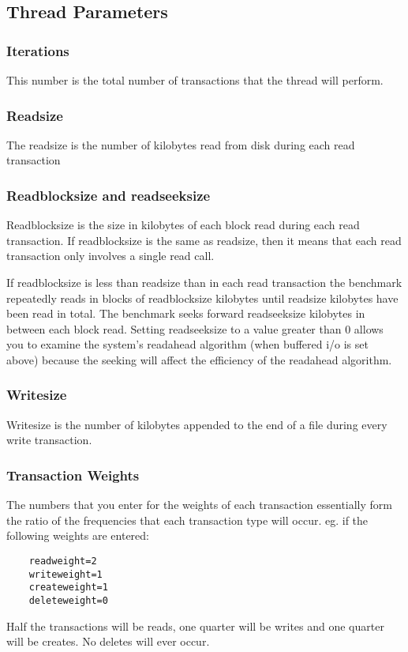 \documentclass[twocolumn]{article}
\begin{document}
\subsection{Thread Parameters}

\subsubsection{Iterations}

This number is the total number of transactions that the thread will
perform.

\subsubsection{Readsize}

The readsize is the number of kilobytes read from disk during each
read transaction

\subsubsection{Readblocksize and readseeksize}

Readblocksize is the size in kilobytes of each block read during each
read transaction.  If readblocksize is the same as readsize, then it
means that each read transaction only involves a single read call.  

If readblocksize is less than readsize than in each read transaction
the benchmark repeatedly reads in blocks of readblocksize kilobytes until
readsize kilobytes have been read in total.  The benchmark seeks
forward readseeksize kilobytes in between each block read.  Setting
readseeksize to a value greater than 0 allows you to examine the
system's readahead algorithm (when buffered i/o is set above) because
the seeking will affect the efficiency of the readahead algorithm.

\subsubsection{Writesize}

Writesize is the number of kilobytes appended to the end of
a file during every write transaction.

\subsubsection{Transaction Weights}

The numbers that you enter for the weights of each transaction
essentially form the ratio of the frequencies that each transaction type
will occur.  eg. if the following weights are entered:
\begin{verbatim}
	readweight=2
	writeweight=1
	createweight=1
	deleteweight=0
\end{verbatim}
Half the transactions will be reads, one quarter will be writes and
one quarter will be creates.  No deletes will ever occur.
\end{document}
